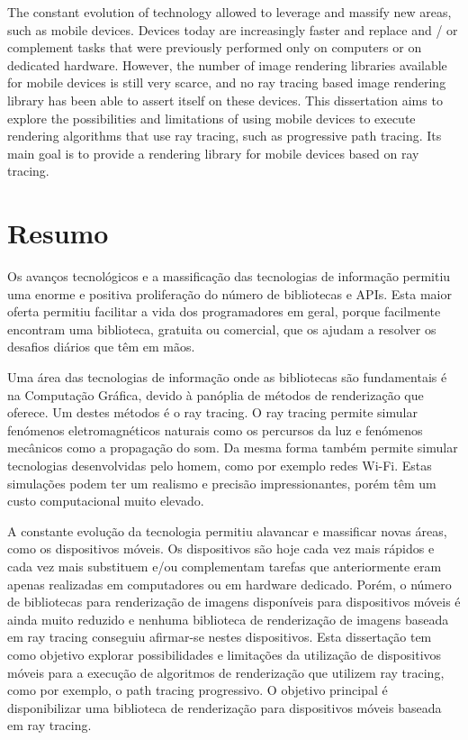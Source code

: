 \documentclass[
  oneside,
  11pt, a4paper,
  footinclude=true,
  headinclude=true,
  cleardoublepage=empty,
  bibliography=totocnumbered
]{scrbook}
\begin{document}
\par
The constant evolution of technology allowed to leverage and massify new areas, such as mobile devices.
Devices today are increasingly faster and replace and / or complement tasks that were previously performed only on computers or on dedicated hardware.
However, the number of image rendering libraries available for mobile devices is still very scarce, and no ray tracing based image rendering library has been able to assert itself on these devices.
This dissertation aims to explore the possibilities and limitations of using mobile devices to execute rendering algorithms that use ray tracing, such as progressive path tracing.
Its main goal is to provide a rendering library for mobile devices based on ray tracing.

\chapter*{Resumo}

\par
Os avanços tecnológicos e a massificação das tecnologias de informação permitiu uma enorme e positiva proliferação do número de bibliotecas e APIs.
Esta maior oferta permitiu facilitar a vida dos programadores em geral, porque facilmente encontram uma biblioteca, gratuita ou comercial, que os ajudam a resolver os desafios diários que têm em mãos.

\par
Uma área das tecnologias de informação onde as bibliotecas são fundamentais é na Computação Gráfica, devido à panóplia de métodos de renderização que oferece.
Um destes métodos é o ray tracing.
O ray tracing permite simular fenómenos eletromagnéticos naturais como os percursos da luz e fenómenos mecânicos como a propagação do som.
Da mesma forma também permite simular tecnologias desenvolvidas pelo homem, como por exemplo redes Wi-Fi.
Estas simulações podem ter um realismo e precisão impressionantes, porém têm um custo computacional muito elevado.

\par
A constante evolução da tecnologia permitiu alavancar e massificar novas áreas, como os dispositivos móveis.
Os dispositivos são hoje cada vez mais rápidos e cada vez mais substituem e/ou complementam tarefas que anteriormente eram apenas realizadas em computadores ou em hardware dedicado.
Porém, o número de bibliotecas para renderização de imagens disponíveis para dispositivos móveis é ainda muito reduzido e nenhuma biblioteca de renderização de imagens baseada em ray tracing conseguiu afirmar-se nestes dispositivos.
Esta dissertação tem como objetivo explorar possibilidades e limitações da utilização de dispositivos móveis para a execução de algoritmos de renderização que utilizem ray tracing, como por exemplo, o path tracing progressivo.
O objetivo principal é disponibilizar uma biblioteca de renderização para dispositivos móveis baseada em ray tracing.
	
\end{document}
